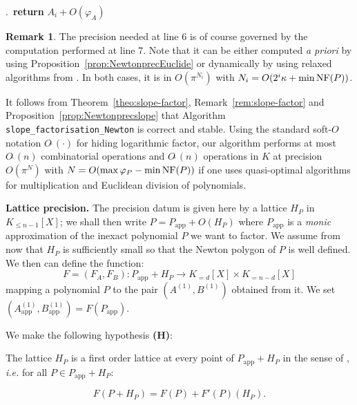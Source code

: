 \documentclass{sig-alternate-05-2015}
\newcommand{\softO}{O\tilde{~}}
\newcommand{\NF}{\text{\rm NF}}
\newcommand{\app}{\textrm{app}}
\theoremstyle{definition}
\newtheorem{rem}[theo]{Remark}
\begin{document}
\smallskip{}.\ 
{\bf return} $A_i + O(\varphi_A)$

\vspace{-1ex}\noindent\hrulefill

\begin{rem}
The precision needed at line 6 is of course governed by the computation
performed at line 7. Note that it can be either computed \emph{a
priori} by using Proposition~\ref{prop:NewtonprecEuclide} or dynamically 
by using relaxed algorithms from 
\cites{hoeven:02a,hoeven:07a,berthomieu-hoeven-lecerf:11a}. In both 
cases, it is in $O(\pi^{N_i})$ with $N_i = O(2^i \kappa + \min 
\NF(P))$.
\end{rem}

\noindent
It follows from Theorem~\ref{theo:slope-factor}, 
Remark~\ref{rem:slope-factor} and Proposition~\ref{prop:Newtonprecslope} 
that Algorithm {\tt slope\_factorisation\_Newton} is correct and 
stable. Using the standard soft-$O$ notation $\softO(\cdot)$ for
hiding logarithmic factor, our algorithm performs at most $\softO(n)$ 
combinatorial operations and $\softO(n)$ operations in $K$ at precision 
$O(\pi^N)$ with $N = O(\max \varphi_P - \min \NF(P))$ if one uses 
quasi-optimal algorithms for multiplication and Euclidean division of 
polynomials.


\medskip

\noindent
{\bf Lattice precision.}
The precision datum is given here by a lattice $H_P$ in $K_{\leq n{-}1}
[X]$; we shall then write
$P = P_\app + O(H_P)$
where $P_\app$ is a \emph{monic} approximation of the inexact polynomial 
$P$ we want to factor. We assume from now that $H_P$ is sufficiently 
small so that the Newton polygon of $P$ is well defined. We then can
define the function:
$$F = (F_A, F_B) : P_\app + H_P \to K_{=d}[X] \times K_{=n{-}d}[X]$$
mapping a polynomial $P$ to the pair $(A^{(1)}, B^{(1)})$ obtained
from it. We set $(A_\app^{(1)}, B_\app^{(1)}) = F(P_\app)$.

We make the following hypothesis \textbf{(H)}:

\medskip

\noindent
\hfill
\begin{minipage}{8cm}
The lattice $H_P$ is a first order lattice at every point
of $P_\app + H_P$ in the sense of \cite[Definition~3.3]{caruso-roe-vaccon:14a},
\emph{i.e.} for all $P \in P_\app + H_P$:

\vspace{-5mm}

$$F(P + H_P) = F(P) + F'(P)(H_P).$$
\end{minipage}
\hfill \null
\end{document}
